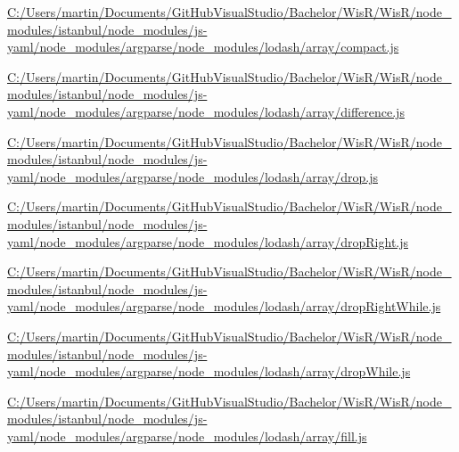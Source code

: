 \begin{DoxyCompactItemize}
\item 
\hyperlink{_c_1_2_users_2martin_2_documents_2_git_hub_visual_studio_2_bachelor_2_wis_r_2_wis_r_2node_module79886eaa68f1d4e1aeeec1740f9c7e51}{C\+:/\+Users/martin/\+Documents/\+Git\+Hub\+Visual\+Studio/\+Bachelor/\+Wis\+R/\+Wis\+R/node\+\_\+modules/istanbul/node\+\_\+modules/js-\/yaml/node\+\_\+modules/argparse/node\+\_\+modules/lodash/array/compact.\+js}
\item 
\hyperlink{_c_1_2_users_2martin_2_documents_2_git_hub_visual_studio_2_bachelor_2_wis_r_2_wis_r_2node_modulee21003b828b8b46f0a0e137a54c15fb1}{C\+:/\+Users/martin/\+Documents/\+Git\+Hub\+Visual\+Studio/\+Bachelor/\+Wis\+R/\+Wis\+R/node\+\_\+modules/istanbul/node\+\_\+modules/js-\/yaml/node\+\_\+modules/argparse/node\+\_\+modules/lodash/array/difference.\+js}
\item 
\hyperlink{_c_1_2_users_2martin_2_documents_2_git_hub_visual_studio_2_bachelor_2_wis_r_2_wis_r_2node_module9aa516c5269202b61ae40adab339cf00}{C\+:/\+Users/martin/\+Documents/\+Git\+Hub\+Visual\+Studio/\+Bachelor/\+Wis\+R/\+Wis\+R/node\+\_\+modules/istanbul/node\+\_\+modules/js-\/yaml/node\+\_\+modules/argparse/node\+\_\+modules/lodash/array/drop.\+js}
\item 
\hyperlink{_c_1_2_users_2martin_2_documents_2_git_hub_visual_studio_2_bachelor_2_wis_r_2_wis_r_2node_module15253c61807459a50c1d351ebc683b73}{C\+:/\+Users/martin/\+Documents/\+Git\+Hub\+Visual\+Studio/\+Bachelor/\+Wis\+R/\+Wis\+R/node\+\_\+modules/istanbul/node\+\_\+modules/js-\/yaml/node\+\_\+modules/argparse/node\+\_\+modules/lodash/array/drop\+Right.\+js}
\item 
\hyperlink{_c_1_2_users_2martin_2_documents_2_git_hub_visual_studio_2_bachelor_2_wis_r_2_wis_r_2node_module50a5121a664fabeec4d0995f9521c488}{C\+:/\+Users/martin/\+Documents/\+Git\+Hub\+Visual\+Studio/\+Bachelor/\+Wis\+R/\+Wis\+R/node\+\_\+modules/istanbul/node\+\_\+modules/js-\/yaml/node\+\_\+modules/argparse/node\+\_\+modules/lodash/array/drop\+Right\+While.\+js}
\item 
\hyperlink{_c_1_2_users_2martin_2_documents_2_git_hub_visual_studio_2_bachelor_2_wis_r_2_wis_r_2node_module2d5a3da12e039b6ecc7f2c628817f69d}{C\+:/\+Users/martin/\+Documents/\+Git\+Hub\+Visual\+Studio/\+Bachelor/\+Wis\+R/\+Wis\+R/node\+\_\+modules/istanbul/node\+\_\+modules/js-\/yaml/node\+\_\+modules/argparse/node\+\_\+modules/lodash/array/drop\+While.\+js}
\item 
\hyperlink{_c_1_2_users_2martin_2_documents_2_git_hub_visual_studio_2_bachelor_2_wis_r_2_wis_r_2node_module2fa708454c75d293480be5f3870ef3d5}{C\+:/\+Users/martin/\+Documents/\+Git\+Hub\+Visual\+Studio/\+Bachelor/\+Wis\+R/\+Wis\+R/node\+\_\+modules/istanbul/node\+\_\+modules/js-\/yaml/node\+\_\+modules/argparse/node\+\_\+modules/lodash/array/fill.\+js}

\end{DoxyCompactItemize}
